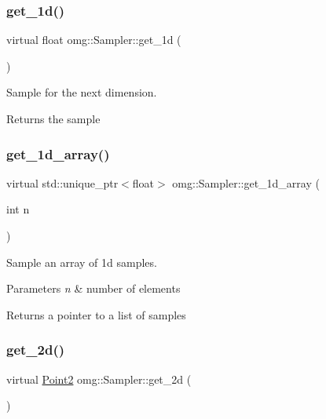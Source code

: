 \subsubsection{\texorpdfstring{get\_1d()}{get\_1d()}}
{\footnotesize\ttfamily virtual float omg\+::\+Sampler\+::get\+\_\+1d (\begin{DoxyParamCaption}{ }\end{DoxyParamCaption})\hspace{0.3cm}{\ttfamily [pure virtual]}}



Sample for the next dimension. 

\begin{DoxyReturn}{Returns}
the sample 
\end{DoxyReturn}
\mbox{\label{classomg_1_1_sampler_aeb4b5fa3758c26f2fc3307ce6f6e15f3}} 
\subsubsection{\texorpdfstring{get\_1d\_array()}{get\_1d\_array()}}
{\footnotesize\ttfamily virtual std\+::unique\+\_\+ptr$<$float$>$ omg\+::\+Sampler\+::get\+\_\+1d\+\_\+array (\begin{DoxyParamCaption}\item[{int}]{n }\end{DoxyParamCaption})\hspace{0.3cm}{\ttfamily [virtual]}}



Sample an array of 1d samples. 


\begin{DoxyParams}{Parameters}
{\em n} & number of elements \\
\hline
\end{DoxyParams}
\begin{DoxyReturn}{Returns}
a pointer to a list of samples 
\end{DoxyReturn}
\mbox{\label{classomg_1_1_sampler_a75c8c5ca9751d3c3c5ac025f3713bda0}} 
\subsubsection{\texorpdfstring{get\_2d()}{get\_2d()}}
{\footnotesize\ttfamily virtual \mbox{\hyperlink{namespaceomg_a18e42fb7bbc4159e9137145b866ec578}{Point2}} omg\+::\+Sampler\+::get\+\_\+2d (\begin{DoxyParamCaption}{ }\end{DoxyParamCaption})\hspace{0.3cm}{\ttfamily [pure virtual]}}




